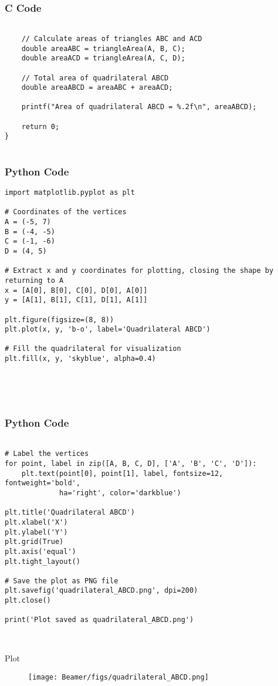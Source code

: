 \documentclass{beamer}
\begin{document}
\begin{frame}[fragile]
    \frametitle{C Code}
    \begin{lstlisting}

    // Calculate areas of triangles ABC and ACD
    double areaABC = triangleArea(A, B, C);
    double areaACD = triangleArea(A, C, D);

    // Total area of quadrilateral ABCD
    double areaABCD = areaABC + areaACD;

    printf("Area of quadrilateral ABCD = %.2f\n", areaABCD);

    return 0;
}


    \end{lstlisting}
\end{frame}







\begin{frame}[fragile]
    \frametitle{Python Code}
    \begin{lstlisting}
import matplotlib.pyplot as plt

# Coordinates of the vertices
A = (-5, 7)
B = (-4, -5)
C = (-1, -6)
D = (4, 5)

# Extract x and y coordinates for plotting, closing the shape by returning to A
x = [A[0], B[0], C[0], D[0], A[0]]
y = [A[1], B[1], C[1], D[1], A[1]]

plt.figure(figsize=(8, 8))
plt.plot(x, y, 'b-o', label='Quadrilateral ABCD')

# Fill the quadrilateral for visualization
plt.fill(x, y, 'skyblue', alpha=0.4)





    \end{lstlisting}
\end{frame}


\begin{frame}[fragile]
    \frametitle{Python Code}
    \begin{lstlisting}

# Label the vertices
for point, label in zip([A, B, C, D], ['A', 'B', 'C', 'D']):
    plt.text(point[0], point[1], label, fontsize=12, fontweight='bold',
             ha='right', color='darkblue')

plt.title('Quadrilateral ABCD')
plt.xlabel('X')
plt.ylabel('Y')
plt.grid(True)
plt.axis('equal')
plt.tight_layout()

# Save the plot as PNG file
plt.savefig('quadrilateral_ABCD.png', dpi=200)
plt.close()

print('Plot saved as quadrilateral_ABCD.png')



    \end{lstlisting}
\end{frame}




  
\begin{frame}{Plot}

\begin{figure}
    \centering
    \texttt{[image: Beamer/figs/quadrilateral\_ABCD.png]}
    \caption{}
    \label{fig:placeholder}
\end{figure}

\end{frame}
\end{document}
